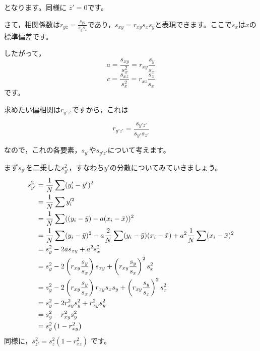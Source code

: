 \documentclass[dvipsnames]{ltjsarticle}
\begin{document}
となります。同様に $ \bar{z}' = 0 $です。

さて，相関係数は$r_{yz} = \frac{s_{yz}}{s_y s_z}$であり，$s_{xy} = r_{xy} s_x s_y$と表現できます。ここで$s_x$は$x$の標準偏差です。

したがって，
\[ a = \frac{s_{xy}}{s_x^2} = r_{xy} \frac{s_y}{s_x} \]
\[ c = \frac{s_{xz}}{s_x^2} = r_{xz} \frac{s_z}{s_x} \]
です。

求めたい偏相関は$r_{y'z'}$ですから，これは

\[ r_{y'z'} = \frac{s_{y'z'}}{s_{y'} s_{z'}} \]

なので，これの各要素，$s_{y'}$や$s_{y'z'}$について考えます。

まず$s_{y'}$を二乗した$s_{y'}^2$，すなわち$y'$の分散についてみていきましょう。
\begin{align}
    s_{y'}^2 & = \frac{1}{N} \sum (y_i' - \bar{y}')^2 \notag\\
            & = \frac{1}{N} \sum y_i'^2                 \notag\\
            & = \frac{1}{N} \sum ((y_i - \bar{y}) - a(x_i - \bar{x}))^2 \notag\\
            & = \frac{1}{N} \sum (y_i - \bar{y})^2 - a\frac{2}{N}\sum(y_i - \bar{y})(x_i - \bar{x}) + a^2\frac{1}{N}\sum(x_i - \bar{x})^2       \notag\\
            &= s_y^2 - 2as_{xy} + a^2 s_x^2                     \notag\\
            &= s_y^2 - 2 \left( r_{xy} \frac{s_y}{s_x} \right) s_{xy} + \left( r_{xy} \frac{s_y}{s_x} \right)^2 s_x^2                           \notag \\
            & = s_y^2 - 2 \left( r_{xy} \frac{s_y}{s_x} \right) r_{xy} s_x s_y + \left( r_{xy} \frac{s_y}{s_x} \right)^2 s_x^2              \notag \\
            & = s_y^2 -2r_{xy}^2s_y^2 + r_{xy}^2s_y^2           \notag \\
            & = s_y^2 -r_{xy}^2s_y^2           \notag \\
            &= s_y^2 \left( 1 - r_{xy}^2 \right)
\end{align}
同様に，$s_{z'}^2 = s_z^2 \left( 1 - r_{xz}^2 \right)$ です。
\end{document}
